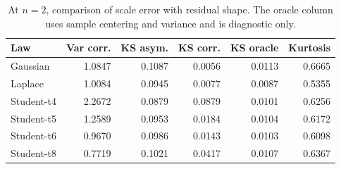 \begin{table}[H]
\centering
\caption{At $n=2$, comparison of scale error with residual shape. The oracle column uses sample centering and variance and is diagnostic only.}
\label{tab:n2-diagnostic}
\begin{tabular}{lrrrrr}
\toprule
Law & Var corr. & KS asym. & KS corr. & KS oracle & Kurtosis \\
\midrule
Gaussian & 1.0847 & 0.1087 & 0.0056 & 0.0113 & 0.6665 \\
Laplace & 1.0084 & 0.0945 & 0.0077 & 0.0087 & 0.5355 \\
Student-t4 & 2.2672 & 0.0879 & 0.0879 & 0.0101 & 0.6256 \\
Student-t5 & 1.2589 & 0.0953 & 0.0184 & 0.0104 & 0.6172 \\
Student-t6 & 0.9670 & 0.0986 & 0.0143 & 0.0103 & 0.6098 \\
Student-t8 & 0.7719 & 0.1021 & 0.0417 & 0.0107 & 0.6367 \\
\bottomrule
\end{tabular}
\end{table}
